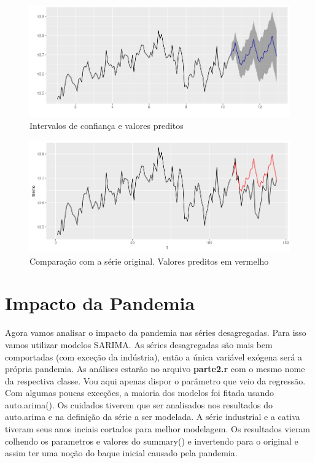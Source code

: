 \documentclass[10pt,a4paper]{article}
\begin{document}
\begin{figure}[h]
\centering
\includegraphics[width=.8 \linewidth]{../confidenceSARIMA.png} 
\caption{Intervalos de confiança e valores preditos}
\end{figure}

\begin{figure}[ht]
\centering
\includegraphics[width=.8 \linewidth]{../fittedSARIMA.png} 
\caption{Comparação com a série original. Valores preditos em vermelho}
\end{figure}


\section{Impacto da Pandemia}

Agora vamos analisar o impacto da pandemia nas séries desagregadas. Para isso vamos utilizar modelos SARIMA. As séries desagregadas são mais bem comportadas (com exceção da indústria), então a única variável exógena será a própria pandemia. As análises estarão no arquivo \textbf{parte2.r} com o mesmo nome da respectiva classe. Vou aqui apenas dispor o parâmetro que veio da regressão. Com algumas poucas exceções, a maioria dos modelos foi fitada usando auto.arima(). Os cuidados tiverem que ser analisados nos resultados do auto.arima e na definição da série a ser modelada. A série industrial e a cativa tiveram seus anos inciais cortados para melhor modelagem. Os resultados vieram colhendo os parametros e valores do summary() e invertendo para o original e assim ter uma noção do baque inicial causado pela pandemia.
\end{document}
